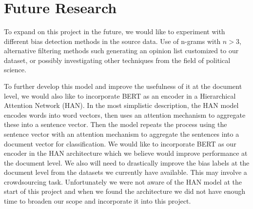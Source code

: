 \documentclass[10pt,a4paper,onecolumn]{article}
\begin{document}
\section*{Future Research}
\paragraph{}
To expand on this project in the future, we would like to experiment with different bias detection methods in the source data. Use of n-grams with $ n > 3 $, alternative filtering methods such generating an opinion list customized to our dataset, or possibly investigating other techniques from the field of political science. 

To further develop this model and improve the usefulness of it at the document level, we would also like to incorporate BERT as an encoder in a Hierarchical Attention Network (HAN). In the most simplistic description, the HAN model encodes words into word vectors, then uses an attention mechanism to aggregate these into a sentence vector. Then the model repeats the process using the sentence vector with an attention mechanism to aggregate the sentences into a document vector for classification. We would like to incorporate BERT as our encoder in the HAN architecture which we believe would improve performance at the document level. We also will need to drastically improve the bias labels at the document level from the datasets we currently have available. This may involve a crowdsourcing task. Unfortunately we were not aware of the HAN model at the start of this project and when we found the architecture we did not have enough time to broaden our scope and incorporate it into this project.



\end{document}

